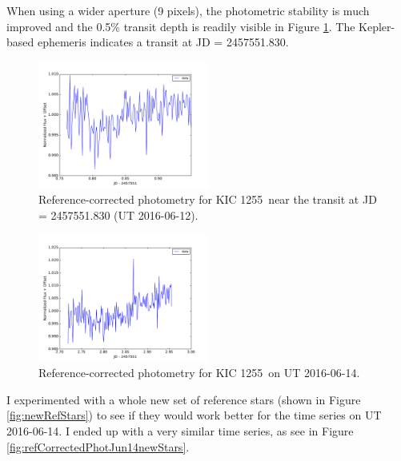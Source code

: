 \documentclass[twocolumn]{aastex61}
\newcommand{\shStar}{KIC 1255}
\begin{document}
When using a wider aperture (9 pixels), the photometric stability is much improved and the 0.5\% transit depth is readily visible in Figure \ref{fig:refCorrectedPhotJun12}.
The Kepler-based ephemeris indicates a transit at JD = 2457551.830.

\begin{figure}
\begin{centering}
\includegraphics[width=0.5\textwidth]{images/refcor_01.pdf}
\caption{Reference-corrected photometry for \shStar\ near the transit at JD = 2457551.830 (UT 2016-06-12).}\label{fig:refCorrectedPhotJun12}
\end{centering}
\end{figure}

\begin{figure}
\begin{centering}
\includegraphics[width=0.5\textwidth]{images/refcor_aug14.pdf}
\caption{Reference-corrected photometry for \shStar\ on UT 2016-06-14.}\label{fig:refCorrectedPhotJun14}
\end{centering}
\end{figure}

I experimented with a whole new set of reference stars (shown in Figure \ref{fig:newRefStars}) to see if they would work better for the time series on UT 2016-06-14.
I ended up with a very similar time series, as see in Figure \ref{fig:refCorrectedPhotJun14newStars}.
\end{document}
